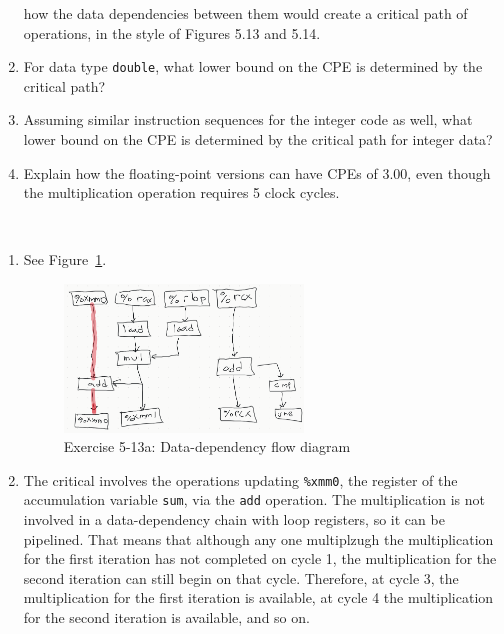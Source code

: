 \documentclass[12pt]{article}
\newenvironment{ex}[2][Exercise]{\begin{trivlist}
		\item[\hskip \labelsep {\bfseries #1}\hskip \labelsep {\bfseries #2.}]}{\end{trivlist}}
\newenvironment{sol}[1][Solution]{\begin{trivlist}
		\item[\hskip \labelsep {\bfseries #1:}]}{\end{trivlist}}
\begin{document}
\begin{ex}{5.13}
\begin{enumerate}[label=(\alph*)]
		how the data dependencies between them would create a critical path of operations, in the
		style of Figures 5.13 and 5.14.
		\item For data type \texttt{double}, what lower bound on the CPE is determined by the
		critical path?
		\item Assuming similar instruction sequences for the integer code as well, what lower
		bound on the CPE is determined by the critical path for integer data?
		\item Explain how the floating-point versions can have CPEs of 3.00, even though
		the multiplication operation requires 5 clock cycles.
	\end{enumerate}
\end{ex}

\begin{sol}
	\
	\begin{enumerate}[label=(\alph*)]
		\item See Figure~\ref{fig:ex-05.13a}.
		\begin{figure}
			\centering
			\includegraphics[width=0.6\textwidth]{exercise-05-13a}
			\caption{Exercise 5-13a: Data-dependency flow diagram}
			\label{fig:ex-05.13a}
		\end{figure}
		\item The critical involves the operations updating \texttt{\%xmm0}, the register
		of the accumulation variable \texttt{sum}, via the \texttt{add} operation. The
		multiplication is not involved in a data-dependency chain with loop registers,
		so it can be pipelined. That means that although any one multiplzugh the multiplication
		for the first iteration has not completed on cycle 1, the multiplication for the
		second iteration can still begin on that cycle. Therefore, at cycle 3, the multiplication
		for the first iteration is available, at cycle 4 the multiplication for the second
		iteration is available, and so on.
		

\end{enumerate}
\end{sol}
\end{document}
